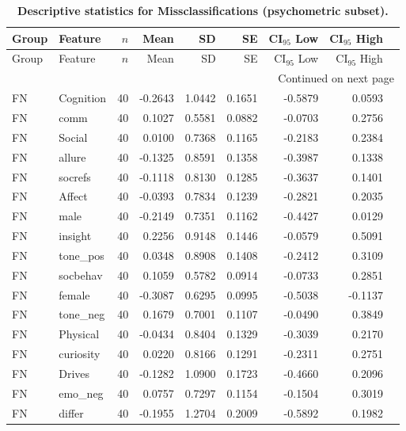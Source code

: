 \begingroup
\scriptsize %
\setlength{\LTcapwidth}{\textwidth}
\setlength\LTleft{\fill}
\setlength\LTright{\fill}
\begin{longtable}{@{}llrrrrrrr@{}} 
\caption[Descriptive statistics for Missclassifications (psychometric subset)]{\textbf{Descriptive statistics for Missclassifications (psychometric subset).}}\label{tab:fnfp_psychometric}\\
\toprule
Group & Feature & $n$ & Mean & SD & SE & CI$_{95}$ Low & CI$_{95}$ High \\
\midrule
\endfirsthead
\toprule
Group & Feature & $n$ & Mean & SD & SE & CI$_{95}$ Low & CI$_{95}$ High \\
\midrule
\endhead
\midrule
\multicolumn{9}{r}{{Continued on next page}} \\
\bottomrule
\endfoot
\bottomrule
\endlastfoot
FN & Cognition & 40 & -0.2643 & 1.0442 & 0.1651 & -0.5879 & 0.0593 \\
FN & comm & 40 & 0.1027 & 0.5581 & 0.0882 & -0.0703 & 0.2756 \\
FN & Social & 40 & 0.0100 & 0.7368 & 0.1165 & -0.2183 & 0.2384 \\
FN & allure & 40 & -0.1325 & 0.8591 & 0.1358 & -0.3987 & 0.1338 \\
FN & socrefs & 40 & -0.1118 & 0.8130 & 0.1285 & -0.3637 & 0.1401 \\
FN & Affect & 40 & -0.0393 & 0.7834 & 0.1239 & -0.2821 & 0.2035 \\
FN & male & 40 & -0.2149 & 0.7351 & 0.1162 & -0.4427 & 0.0129 \\
FN & insight & 40 & 0.2256 & 0.9148 & 0.1446 & -0.0579 & 0.5091 \\
FN & tone\_pos & 40 & 0.0348 & 0.8908 & 0.1408 & -0.2412 & 0.3109 \\
FN & socbehav & 40 & 0.1059 & 0.5782 & 0.0914 & -0.0733 & 0.2851 \\
FN & female & 40 & -0.3087 & 0.6295 & 0.0995 & -0.5038 & -0.1137 \\
FN & tone\_neg & 40 & 0.1679 & 0.7001 & 0.1107 & -0.0490 & 0.3849 \\
FN & Physical & 40 & -0.0434 & 0.8404 & 0.1329 & -0.3039 & 0.2170 \\
FN & curiosity & 40 & 0.0220 & 0.8166 & 0.1291 & -0.2311 & 0.2751 \\
FN & Drives & 40 & -0.1282 & 1.0900 & 0.1723 & -0.4660 & 0.2096 \\
FN & emo\_neg & 40 & 0.0757 & 0.7297 & 0.1154 & -0.1504 & 0.3019 \\
FN & differ & 40 & -0.1955 & 1.2704 & 0.2009 & -0.5892 & 0.1982 \\

\end{longtable}
